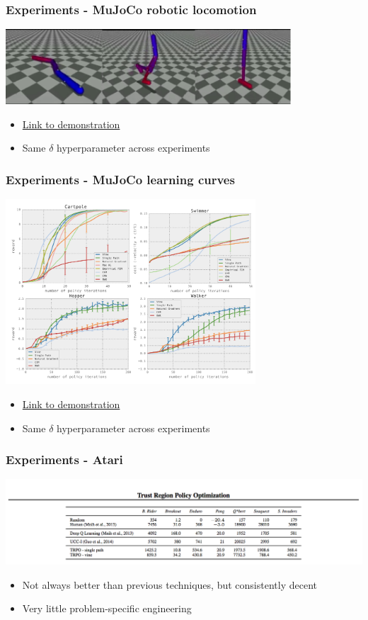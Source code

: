 \documentclass{beamer}
\begin{document}
\begin{frame}
  \frametitle{Experiments - MuJoCo robotic locomotion}

  \includegraphics[width=0.8\textwidth]{mujoco.png}

  \begin{itemize}
    \item \href{https://www.youtube.com/watch?v=KJ15iGGJFvQ}{Link to demonstration}
    \item Same $\delta$ hyperparameter across experiments
  \end{itemize}

\end{frame}

\begin{frame}
  \frametitle{Experiments - MuJoCo learning curves}
  \centering
  \includegraphics[width=0.7\textwidth]{experiments.png}

  \begin{itemize}
    \item \href{https://www.youtube.com/watch?v=KJ15iGGJFvQ}{Link to demonstration}
    \item Same $\delta$ hyperparameter across experiments
  \end{itemize}
\end{frame}

\begin{frame}
  \frametitle{Experiments - Atari}
  \includegraphics[width=\textwidth]{games_table.png}

  \begin{itemize}
    \item Not always better than previous techniques, but consistently decent
    \item Very little problem-specific engineering
  \end{itemize}
\end{frame}
\end{document}
